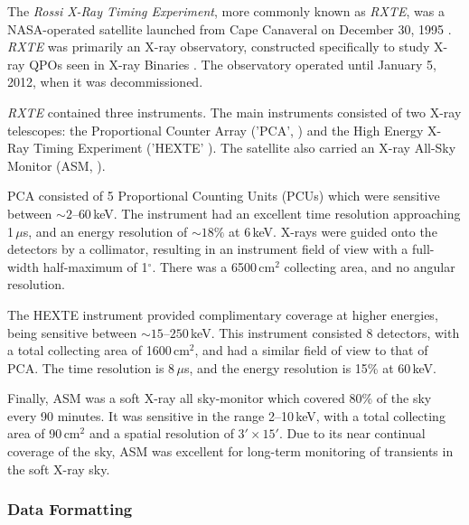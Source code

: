 \par The \textit{Rossi X-Ray Timing Experiment}, more commonly known as \textit{RXTE}, was a NASA-operated satellite launched from Cape Canaveral on December 30, 1995 \citep{Bradt_RXTE}.  \textit{RXTE} was primarily an X-ray observatory, constructed specifically to study X-ray QPOs seen in X-ray Binaries \citep{Bradt_XTEaims}.  The observatory operated until January 5, 2012, when it was decommissioned.
\par \textit{RXTE} contained three instruments.  The main instruments consisted of two X-ray telescopes: the Proportional Counter Array ('PCA', \citealp{Jahoda_PCA}) and the High Energy X-Ray Timing Experiment ('HEXTE' \citealp{Gruber_HEXTE}).  The satellite also carried an X-ray All-Sky Monitor (ASM, \citealp{Levine_ASM}).
\par PCA consisted of 5 Proportional Counting Units (PCUs) which were sensitive between $\sim2$--$60$\,keV.  The instrument had an excellent time resolution approaching 1\,$\mu$s, and an energy resolution of $\sim18\%$ at 6\,keV.  X-rays were guided onto the detectors by a collimator, resulting in an instrument field of view with a full-width half-maximum of 1$^\circ$.  There was a 6500\,cm$^2$ collecting area, and no angular resolution.
\par The HEXTE instrument provided complimentary coverage at higher energies, being sensitive between $\sim15$--$250$\,keV.  This instrument consisted 8 detectors, with a total collecting area of 1600\,cm$^2$, and had a similar field of view to that of PCA.  The time resolution is 8\,$\mu$s, and the energy resolution is 15\% at 60\,keV.
\par Finally, ASM was a soft X-ray all sky-monitor which covered 80\% of the sky every 90 minutes.  It was sensitive in the range 2--10\,keV, with a total collecting area of 90\,cm$^2$ and a spatial resolution of $3'\times15'$.  Due to its near continual coverage of the sky, ASM was excellent for long-term monitoring of transients in the soft X-ray sky.

\subsubsection{Data Formatting}

